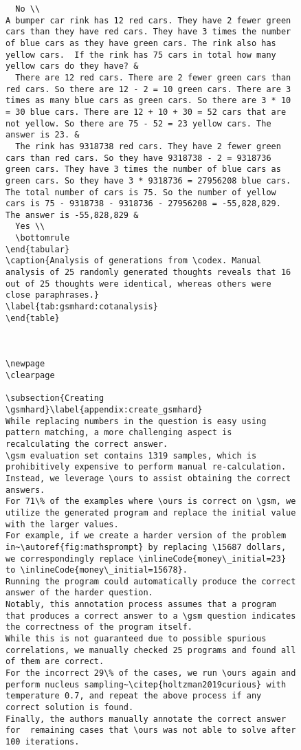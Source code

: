 \documentclass[dvipsnames]{article} \usepackage[accepted]{icml2022}
\def\1{\bm{1}}
\newcommand{\ours}{\textsc{PaL}\xspace}
\newcommand{\inlineCode}[1]{\texttt{{#1}}}
\newcommand{\gsm}{\textsc{gsm8k}\xspace}
\newcommand{\gsmhard}{\textsc{gsm-hard}\xspace}
\newcommand{\codex}{\textsc{Codex}\xspace}
\begin{document}
\begin{figure*}[!ht]
\begin{subfigure}[t]{.95\textwidth}
\begin{verbatim}
  No \\
A bumper car rink has 12 red cars. They have 2 fewer green cars than they have red cars. They have 3 times the number of blue cars as they have green cars. The rink also has yellow cars.  If the rink has 75 cars in total how many yellow cars do they have? &
  There are 12 red cars. There are 2 fewer green cars than red cars. So there are 12 - 2 = 10 green cars. There are 3 times as many blue cars as green cars. So there are 3 * 10 = 30 blue cars. There are 12 + 10 + 30 = 52 cars that are not yellow. So there are 75 - 52 = 23 yellow cars. The answer is 23. &
  The rink has 9318738 red cars. They have 2 fewer green cars than red cars. So they have 9318738 - 2 = 9318736 green cars. They have 3 times the number of blue cars as green cars. So they have 3 * 9318736 = 27956208 blue cars. The total number of cars is 75. So the number of yellow cars is 75 - 9318738 - 9318736 - 27956208 = -55,828,829. The answer is -55,828,829 &
  Yes \\
  \bottomrule
\end{tabular}
\caption{Analysis of generations from \codex. Manual analysis of 25 randomly generated thoughts reveals that 16 out of 25 thoughts were identical, whereas others were close paraphrases.}
\label{tab:gsmhard:cotanalysis}
\end{table}



\newpage
\clearpage

\subsection{Creating \gsmhard}\label{appendix:create_gsmhard}
While replacing numbers in the question is easy using pattern matching, a more challenging aspect is recalculating the correct answer.
\gsm evaluation set contains 1319 samples, which is prohibitively expensive to perform manual re-calculation. 
Instead, we leverage \ours to assist obtaining the correct answers.
For 71\% of the examples where \ours is correct on \gsm, we utilize the generated program and replace the initial value with the larger values.
For example, if we create a harder version of the problem in~\autoref{fig:mathsprompt} by replacing \15687 dollars, we correspondingly replace \inlineCode{money\_initial=23} to \inlineCode{money\_initial=15678}.
Running the program could automatically produce the correct answer of the harder question.
Notably, this annotation process assumes that a program that produces a correct answer to a \gsm question indicates the correctness of the program itself. 
While this is not guaranteed due to possible spurious correlations, we manually checked 25 programs and found all of them are correct. 
For the incorrect 29\% of the cases, we run \ours again and perform nucleus sampling~\citep{holtzman2019curious} with temperature 0.7, and repeat the above process if any correct solution is found.
Finally, the authors manually annotate the correct answer for  remaining cases that \ours was not able to solve after 100 iterations.



\end{verbatim}
\end{subfigure}
\end{figure*}
\end{document}
